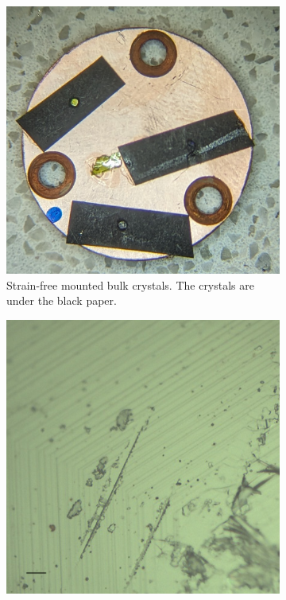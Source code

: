 \documentclass[
	twoside,
	parskip=half,
	a4paper,
]{scrbook}
\begin{document}
\begin{figure}
\begin{subfigure}[t]{.24\textwidth}
		\includegraphics[width=\textwidth]{../figures/mounted_bulk_samples.jpg}
		\caption{Strain-free mounted bulk crystals. The crystals are under the black paper.}
		\label{fig:samples_bulk_mounted}
	\end{subfigure}
	\begin{subfigure}[t]{.24\textwidth}
		\vskip 0pt
		\includegraphics[width=\textwidth]{../../data/2023-11-02/i005_NiPS3_50x-scalebar.png}

\end{subfigure}
\end{figure}
\end{document}
